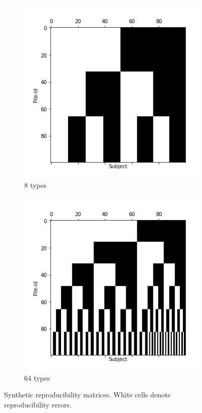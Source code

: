 \documentclass[10pt, conference, compsocconf]{IEEEtran}
\begin{document}
\begin{figure}
\begin{subfigure}[b]{0.3\columnwidth}
                  \includegraphics[width=\columnwidth]{data/Utility_Matrix/Synthetic/synthetic_subject_types/8_SubjectType_utility_matrix.png}
                  \caption{8 types}
        \end{subfigure}
                \begin{subfigure}[b]{0.3\columnwidth}
                  \includegraphics[width=\columnwidth]{data/Utility_Matrix/Synthetic/synthetic_subject_types/64_SubjectType_utility_matrix.png}
                  \caption{64 types}
        \end{subfigure}
\caption{Synthetic reproducibility matrices. White cells denote reproducibility errors.}
\label{fig:synthetic-data}
\end{figure}
\end{document}
